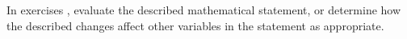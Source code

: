 {\noindent In exercises}
{, evaluate the described mathematical statement, or determine how the described changes affect other variables in the statement as appropriate.}
